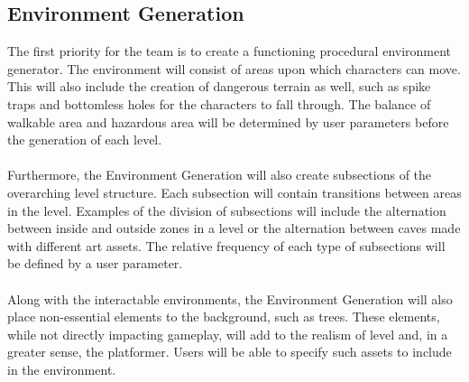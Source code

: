\documentclass[pdftex,12pt,letter]{article}
\begin{document}
\subsection{Environment Generation}
The first priority for the team is to create a functioning procedural environment generator. The environment will consist of  areas upon which characters can move. This will also include the creation of dangerous terrain as well, such as spike traps and bottomless holes for the characters to fall through. The balance of walkable area and hazardous area will be determined by user parameters before the generation of each level. 
\\\\
Furthermore, the Environment Generation will also create subsections of the overarching level structure. Each subsection will contain transitions between areas in the level. Examples of the division of subsections will include the alternation between inside and outside zones in a level or the alternation between caves made with different art assets. The relative frequency of each type of subsections will be defined by a user parameter.
\\\\
Along with the interactable environments, the Environment Generation will also place non-essential elements to the background, such as trees. These elements, while not directly impacting gameplay, will add to the realism of level and, in a greater sense, the platformer. Users will be able to specify such assets to include in the environment. 
\\
\end{document}
